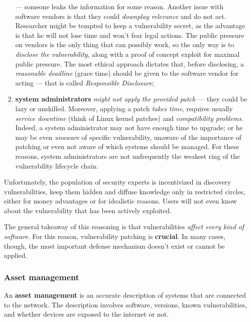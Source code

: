 \documentclass[10pt]{extreport}
\begin{document}
\begin{enumerate}
        --- someone leaks the information for some reason. Another issue with
        software vendors is that they could \emph{downplay relevance} and do
        not act. Researcher might be tempted to keep a vulnerability secret, as
        the advantage is that he will not lose time and won't fear legal
        actions. The public pressure on vendors is the only thing that can possibly
        work, so the only way is to \emph{disclose the vulnerability}, along
        with a proof of concept exploit for maximal public pressure. The most
        ethical approach dictates that, before disclosing, a \emph{reasonable
        deadline} (grace time) should be given to the software vendor for
        acting --- that is called \emph{Responsible Disclosure};
    \item \textbf{system administrators} \emph{might not apply the provided
        patch} --- they could be lazy or unskilled. Moreover, applying a patch
        \emph{takes time}, requires usually \emph{service downtime} (think of
        Linux kernel patches) and \emph{compatibility problems}. Indeed, a
        system administrator may not have enough time to upgrade; or he may be
        even \emph{unaware} of specific vulnerability, unaware of the
        importance of patching or even not aware of which systems should be
        managed. For these reasons, system administrators are not unfrequently
        the weakest ring of the vulnerability lifecycle chain.
\end{enumerate}

Unfortunately, the population of security experts is incentivized in discovery
vulnerabilities, keep them hidden and diffuse knowledge only in restricted
circles, either for money advantages or for idealistic reasons. Users will not
even know about the vulnerability that has been actively exploited.

The general takeaway of this reasoning is that vulnerabilities \emph{affect
every kind of software}. For this reason, vulnerability patching is
\textbf{crucial}. In many cases, though, the most important defense mechanism
doesn't exist or cannot be applied.

\subsubsection{Asset management}

An \textbf{asset management} is an accurate description of systems that are
connected to the network. The description involves software, versions, known
vulnerabilities, and whether devices are exposed to the internet or not.
\end{document}
